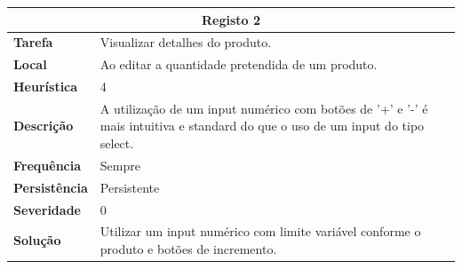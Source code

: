 \documentclass[a4paper,12pt]{article}
\begin{document}
\begin{center}
    \newpage
    \begin{table}[h!]
        \centering
        \begin{tabular}{|m{3cm}|m{12cm}|}
            \hline
            \multicolumn{2}{|c|}{\textbf{Registo 2}}                                                                                                               \\ \hline
            \textbf{Tarefa}       & Visualizar detalhes do produto.                                                                                                \\ \hline
            \textbf{Local}        & Ao editar a quantidade pretendida de um produto.                                                                               \\ \hline
            \textbf{Heurística}   & 4                                                                                                                              \\ \hline
            \textbf{Descrição}    & A utilização de um input numérico com botões de '+' e '-' é mais intuitiva e standard do que o uso de um input do tipo select. \\ \hline
            \textbf{Frequência}   & Sempre                                                                                                                         \\ \hline
            \textbf{Persistência} & Persistente                                                                                                                    \\ \hline
            \textbf{Severidade}   & 0                                                                                                                              \\ \hline
            \textbf{Solução}      & Utilizar um input numérico com limite variável conforme o produto e botões de incremento.                                      \\ \hline
        \end{tabular}
    \end{table}


\end{center}
\end{document}
